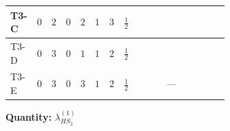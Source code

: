 \documentclass[8pt]{article}
\begin{document}
\begin{landscape}
\begin{longtable}{@{}llcccccc >{\raggedright\arraybackslash}p{0.21\linewidth} >{\raggedright\arraybackslash}p{0.21\linewidth} >{\raggedright\arraybackslash}p{0.21\linewidth}@{}}
\midrule
T3-C & $0$ & $2$ & $0$ & $2$ & $1$ & $3$ & $\frac{1}{2}$ & \scriptsize\adjustbox{max width=\linewidth}{$\begin{gathered} -\frac{15 {g_1}^2 {\lambda_{HS_2}^{(1)}}}{2}\end{gathered}$} & \scriptsize\adjustbox{max width=\linewidth}{$\begin{gathered} +4 {\lambda_{12}^{(1)}} {\lambda_{HS_1}^{(1)}}\end{gathered}$} & \scriptsize\adjustbox{max width=\linewidth}{$\begin{gathered} +6 {\lambda_1} {\lambda_{HS_2}^{(1)}}\end{gathered}$} \\
\midrule
T3-D & $0$ & $3$ & $0$ & $1$ & $1$ & $2$ & $\frac{1}{2}$ & \scriptsize\adjustbox{max width=\linewidth}{$\begin{gathered} -\frac{15 {g_1}^2 {\lambda_{HS_2}^{(1)}}}{2}\end{gathered}$} & \scriptsize\adjustbox{max width=\linewidth}{$\begin{gathered} +6 {\lambda_{12}^{(1)}} {\lambda_{HS_1}^{(1)}}\end{gathered}$} & \scriptsize\adjustbox{max width=\linewidth}{$\begin{gathered} +6 {\lambda_1} {\lambda_{HS_2}^{(1)}}\end{gathered}$} \\
\midrule
T3-E & $0$ & $3$ & $0$ & $3$ & $1$ & $2$ & $\frac{1}{2}$ & \scriptsize\adjustbox{max width=\linewidth}{$\begin{gathered} -\frac{15 {g_1}^2 {\lambda_{HS_2}^{(1)}}}{2}\end{gathered}$} & --- & \scriptsize\adjustbox{max width=\linewidth}{$\begin{gathered} +6 {\lambda_1} {\lambda_{HS_2}^{(1)}}\end{gathered}$} \\
\midrule
\bottomrule
\end{longtable}
\clearpage
\noindent\textbf{Quantity: }$\lambda_{HS_2}^{(1)}$\par\smallskip

\end{landscape}
\end{document}
